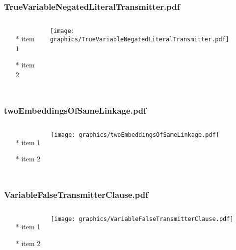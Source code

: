 \documentclass{beamer}
\begin{document}
\begin{frame} \frametitle{TrueVariableNegatedLiteralTransmitter.pdf}
    \begin{columns}[c]
        \begin{itemize}
            \item[*] item 1
            \item[*] item 2
        \end{itemize}
        \begin{minipage}{\linewidth}
            \begin{center}
            \texttt{[image: graphics/TrueVariableNegatedLiteralTransmitter.pdf]}
            \label{gfx:TrueVariableNegatedLiteralTransmitter.pdf}
            \end{center}
        \end{minipage}
    \end{columns}
\end{frame}
\begin{frame} \frametitle{twoEmbeddingsOfSameLinkage.pdf}
    \begin{columns}[c]
        \begin{itemize}
            \item[*] item 1
            \item[*] item 2
        \end{itemize}
        \begin{minipage}{\linewidth}
            \begin{center}
            \texttt{[image: graphics/twoEmbeddingsOfSameLinkage.pdf]}
            \label{gfx:twoEmbeddingsOfSameLinkage.pdf}
            \end{center}
        \end{minipage}
    \end{columns}
\end{frame}
\begin{frame} \frametitle{VariableFalseTransmitterClause.pdf}
    \begin{columns}[c]
        \begin{itemize}
            \item[*] item 1
            \item[*] item 2
        \end{itemize}
        \begin{minipage}{\linewidth}
            \begin{center}
            \texttt{[image: graphics/VariableFalseTransmitterClause.pdf]}
            \label{gfx:VariableFalseTransmitterClause.pdf}
            \end{center}
        \end{minipage}
    \end{columns}
\end{frame}
\end{document}

